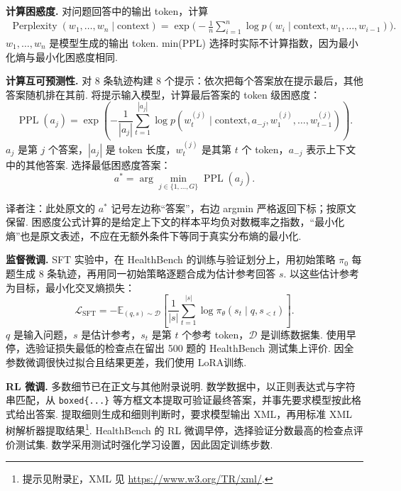 \textbf{计算困惑度.} 对问题回答中的输出 token，计算
\begin{equation}
\begin{split}
\operatorname{Perplexity}(w_1,\ldots,w_n\mid\mathrm{context})
=\exp\Bigg(-\frac1n\sum_{i=1}^n
\log p(w_i\mid\mathrm{context},w_1,\ldots,w_{i-1})\Bigg).
\end{split}\label{cat-eq:perplexity}
\end{equation}
$w_1,\ldots,w_n$ 是模型生成的输出 token. min(PPL) 选择时实际不计算指数，因为最小化熵与最小化困惑度相同.

\textbf{计算互可预测性.} 对 8 条轨迹构建 8 个提示：依次把每个答案放在提示最后，其他答案随机排在其前. 将提示输入模型，计算最后答案的 token 级困惑度：
\begin{equation}
\operatorname{PPL}(a_j)=\exp\left(-\frac1{|a_j|}\sum_{t=1}^{|a_j|}
\log p(w_t^{(j)}\mid\mathrm{context},a_{-j},w_1^{(j)},\ldots,w_{t-1}^{(j)})\right).
\label{cat-eq:mutual-ppl}
\end{equation}
$a_j$ 是第 $j$ 个答案，$|a_j|$ 是 token 长度，$w_t^{(j)}$ 是其第 $t$ 个 token，$a_{-j}$ 表示上下文中的其他答案. 选择最低困惑度答案：
\begin{equation}
a^*=\arg\min_{j\in\{1,\ldots,G\}}\operatorname{PPL}(a_j).
\label{cat-eq:mutual-choice}
\end{equation}
\begin{remark}
译者注：此处原文的 $a^*$ 记号左边称“答案”，右边 argmin 严格返回下标；按原文保留. 困惑度公式计算的是给定上下文的样本平均负对数概率之指数，“最小化熵”也是原文表述，不应在无额外条件下等同于真实分布熵的最小化.
\end{remark}

\textbf{监督微调.} SFT 实验中，在 HealthBench 的训练与验证划分上，用初始策略 $\pi_0$ 每题生成 8 条轨迹，再用同一初始策略逐题合成为估计参考回答 $s$. 以这些估计参考为目标，最小化交叉熵损失：
\begin{equation}
\mathcal L_{\mathrm{SFT}}=-\mathbb E_{(q,s)\sim\mathcal D}
\left[\frac1{|s|}\sum_{t=1}^{|s|}\log\pi_\theta(s_t\mid q,s_{<t})\right].
\label{cat-eq:sft-loss}
\end{equation}
$q$ 是输入问题，$s$ 是估计参考，$s_t$ 是第 $t$ 个参考 token，$\mathcal D$ 是训练数据集. 使用早停，选验证损失最低的检查点在留出 500 题的 HealthBench 测试集上评价. 因全参数微调很快过拟合且结果更差，我们使用 LoRA\cite{cat-hu2022lora}训练.

\textbf{RL 微调.} 多数细节已在正文与其他附录说明. 数学数据中，以正则表达式与字符串匹配，从 \texttt{boxed\{...\}} 等方框文本提取可验证最终答案，并事先要求模型按此格式给出答案. 提取细则生成和细则判断时，要求模型输出 XML，再用标准 XML 树解析器提取结果\footnote{提示见附录\hyperref[cat-app:prompts]{F}，XML 见 \url{https://www.w3.org/TR/xml/}.}. HealthBench 的 RL 微调早停，选择验证分数最高的检查点评价测试集. 数学采用测试时强化学习设置\cite{cat-zuo2025ttrl}，因此固定训练步数.
